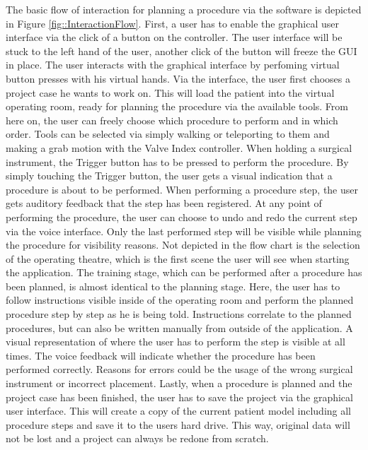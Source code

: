 The basic flow of interaction for planning a procedure via the software is depicted in Figure \ref{fig::InteractionFlow}.
First, a user has to enable the graphical user interface via the click of a button on the controller.
The user interface will be stuck to the left hand of the user, another click of the button will freeze the GUI in place.
The user interacts with the graphical interface by perfoming virtual button presses with his virtual hands.
Via the interface, the user first chooses a project case he wants to work on.
This will load the patient into the virtual operating room, ready for planning the procedure via the available tools.
From here on, the user can freely choose which procedure to perform and in which order.
Tools can be selected via simply walking or teleporting to them and making a grab motion with the Valve Index controller.
When holding a surgical instrument, the Trigger button has to be pressed to perform the procedure.
By simply touching the Trigger button, the user gets a visual indication that a procedure is about to be performed.
When performing a procedure step, the user gets auditory feedback that the step has been registered.
At any point of performing the procedure, the user can choose to undo and redo the current step via the voice interface.
Only the last performed step will be visible while planning the procedure for visibility reasons.
\newline
Not depicted in the flow chart is the selection of the operating theatre, which is the first scene the user will see when starting the application.
\newline
The training stage, which can be performed after a procedure has been planned, is almost identical to the planning stage.
Here, the user has to follow instructions visible inside of the operating room and perform the planned procedure step by step as he is being told.
Instructions correlate to the planned procedures, but can also be written manually from outside of the application. 
A visual representation of where the user has to perform the step is visible at all times.
The voice feedback will indicate whether the procedure has been performed correctly.
Reasons for errors could be the usage of the wrong surgical instrument or incorrect placement.
\newline
Lastly, when a procedure is planned and the project case has been finished, the user has to save the project via the graphical user interface.
This will create a copy of the current patient model including all procedure steps and save it to the users hard drive.
This way, original data will not be lost and a project can always be redone from scratch.
